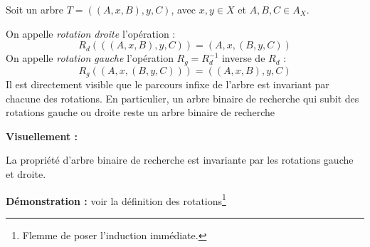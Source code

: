 \documentclass[../../../main.tex]{subfiles}
\begin{document}
 {
	Soit un arbre $T = ((A, x, B), y, C)$, avec $x,y \in X$ et $A, B, C\in A_X$.\newline

	On appelle \textit{rotation droite} l'opération :
	$$R_d(((A, x, B), y, C)) = (A, x, (B, y, C))$$
	On appelle \textit{rotation gauche} l'opération $R_g = R_d^{-1}$ inverse de $R_d$ :
	$$R_g((A, x, (B, y, C))) = ((A, x, B), y, C)$$
	Il est directement visible que le parcours infixe de l'arbre est invariant par chacune des rotations. En particulier, un arbre binaire de recherche qui subit des rotations gauche ou droite reste un arbre binaire de recherche
}
\textbf{Visuellement :} \begin{center}
		
	\end{center}
 La propriété d'arbre binaire de recherche est invariante par les rotations gauche et droite.

\textbf{Démonstration :} voir la définition des rotations\footnote{Flemme de poser l'induction immédiate.}
\end{document}
